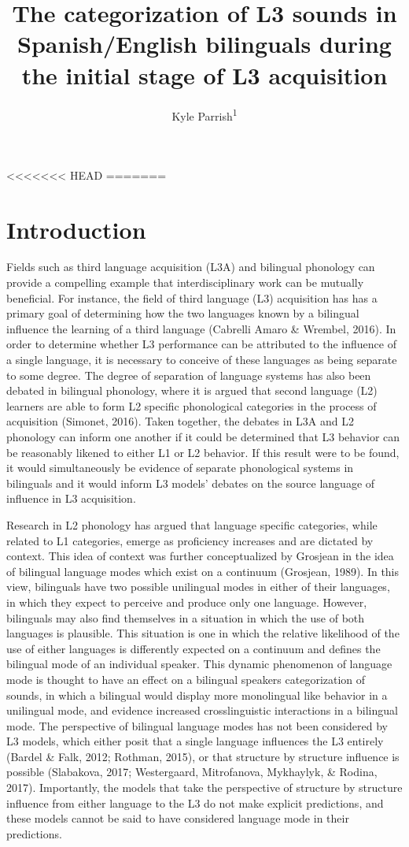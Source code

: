 \documentclass[
  english,
  man]{apa6}
\title{The categorization of L3 sounds in Spanish/English bilinguals during the initial stage of L3 acquisition}
\author{Kyle Parrish\textsuperscript{1}}
\date{}
\affiliation{\vspace{0.5cm}\textsuperscript{1} Rutgers University}
\begin{document}
\maketitle

<<<<<<< HEAD
=======
\hypertarget{introduction}{%
\section{Introduction}\label{introduction}}

Fields such as third language acquisition (L3A) and bilingual phonology can provide a compelling example that interdisciplinary work can be mutually beneficial.
For instance, the field of third language (L3) acquisition has has a primary goal of determining how the two languages known by a bilingual influence the learning of a third language (Cabrelli Amaro \& Wrembel, 2016).
In order to determine whether L3 performance can be attributed to the influence of a single language, it is necessary to conceive of these languages as being separate to some degree.
The degree of separation of language systems has also been debated in bilingual phonology, where it is argued that second language (L2) learners are able to form L2 specific phonological categories in the process of acquisition (Simonet, 2016).
Taken together, the debates in L3A and L2 phonology can inform one another if it could be determined that L3 behavior can be reasonably likened to either L1 or L2 behavior.
If this result were to be found, it would simultaneously be evidence of separate phonological systems in bilinguals and it would inform L3 models' debates on the source language of influence in L3 acquisition.

Research in L2 phonology has argued that language specific categories, while related to L1 categories, emerge as proficiency increases and are dictated by context.
This idea of context was further conceptualized by Grosjean in the idea of bilingual language modes which exist on a continuum (Grosjean, 1989).
In this view, bilinguals have two possible unilingual modes in either of their languages, in which they expect to perceive and produce only one language.
However, bilinguals may also find themselves in a situation in which the use of both languages is plausible.
This situation is one in which the relative likelihood of the use of either languages is differently expected on a continuum and defines the bilingual mode of an individual speaker.
This dynamic phenomenon of language mode is thought to have an effect on a bilingual speakers categorization of sounds, in which a bilingual would display more monolingual like behavior in a unilingual mode, and evidence increased crosslinguistic interactions in a bilingual mode.
The perspective of bilingual language modes has not been considered by L3 models, which either posit that a single language influences the L3 entirely (Bardel \& Falk, 2012; Rothman, 2015), or that structure by structure influence is possible (Slabakova, 2017; Westergaard, Mitrofanova, Mykhaylyk, \& Rodina, 2017).
Importantly, the models that take the perspective of structure by structure influence from either language to the L3 do not make explicit predictions, and these models cannot be said to have considered language mode in their predictions.
\end{document}
